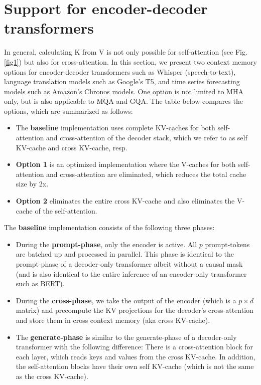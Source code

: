 \documentclass{article}
\begin{document}
\section{Support for encoder-decoder transformers}
In general, calculating K from V is not only possible for self-attention (see Fig. \ref{fig1}) but also for cross-attention. In this section, we present two context memory options for encoder-decoder transformers such as Whisper (speech-to-text), language translation models such as Google’s T5, and time series forecasting models such as Amazon’s Chronos models. One option is not limited to MHA only, but is also applicable to MQA and GQA. The table below compares the options, which are summarized as follows:
\begin{itemize}[topsep=-1pt, itemsep=-1pt]
  \item The \textbf{baseline} implementation uses complete KV-caches for both self-attention and cross-attention of the decoder stack, which we refer to as self KV-cache and cross KV-cache, resp.
  \item \textbf{Option 1} is an optimized implementation where the V-caches for both self-attention and cross-attention are eliminated, which reduces the total cache size by 2x.
  \item \textbf{Option 2} eliminates the entire cross KV-cache and also eliminates the V-cache of the self-attention.
\end{itemize}
The \textbf{baseline} implementation consists of the following three phases:
\begin{itemize}[topsep=-1pt, itemsep=-1pt]
  \item During the \textbf{prompt-phase}, only the encoder is active. All $p$ prompt-tokens are batched up and processed in parallel. This phase is identical to the prompt-phase of a decoder-only transformer albeit without a causal mask (and is also identical to the entire inference of an encoder-only transformer such as BERT).
  \item During the \textbf{cross-phase}, we take the output of the encoder (which is a $p \times d$ matrix) and precompute the KV projections for the decoder’s cross-attention and store them in cross context memory (aka cross KV-cache).
  \item The \textbf{generate-phase} is similar to the generate-phase of a decoder-only transformer with the following difference: There is a cross-attention block for each layer, which reads keys and values from the cross KV-cache. In addition, the self-attention blocks have their own self KV-cache (which is not the same as the cross KV-cache).
\end{itemize}
\end{document}
